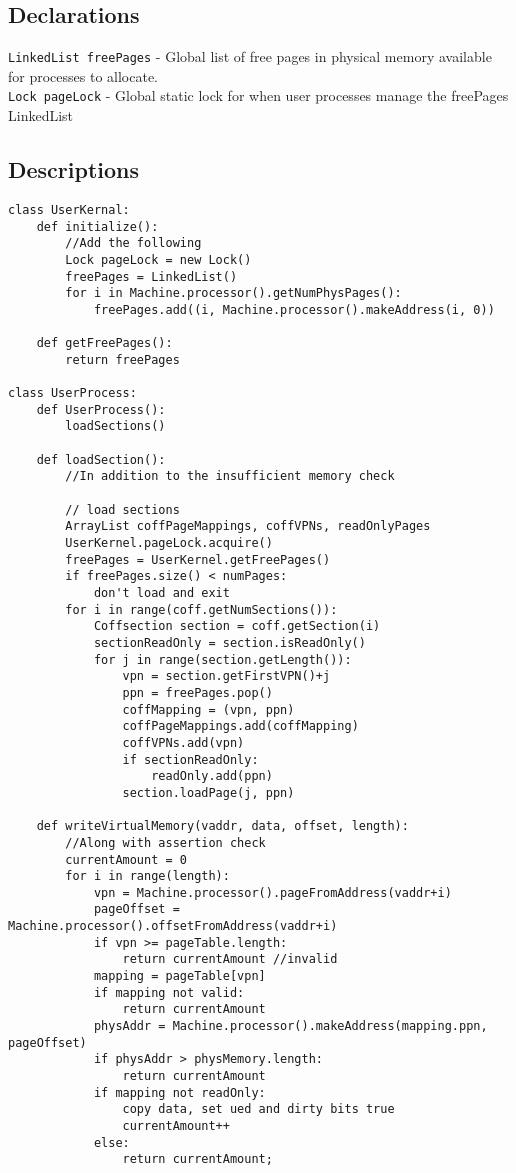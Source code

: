 \documentclass{article}
\begin{document}
\subsection{Declarations}
\texttt{LinkedList freePages} - Global list of free pages in physical memory available for processes to allocate. \\
\texttt{Lock pageLock} - Global static lock for when user processes manage the freePages LinkedList

\subsection{Descriptions}

\begin{verbatim}
class UserKernal:
    def initialize():
        //Add the following
        Lock pageLock = new Lock()
        freePages = LinkedList()
        for i in Machine.processor().getNumPhysPages():
            freePages.add((i, Machine.processor().makeAddress(i, 0))
            
    def getFreePages():
        return freePages
        
class UserProcess:
    def UserProcess():
        loadSections()
    
    def loadSection():
        //In addition to the insufficient memory check

        // load sections
        ArrayList coffPageMappings, coffVPNs, readOnlyPages
        UserKernel.pageLock.acquire()
        freePages = UserKernel.getFreePages()
        if freePages.size() < numPages:
            don't load and exit
        for i in range(coff.getNumSections()):
            Coffsection section = coff.getSection(i)
            sectionReadOnly = section.isReadOnly()
            for j in range(section.getLength()):
                vpn = section.getFirstVPN()+j
                ppn = freePages.pop()
                coffMapping = (vpn, ppn)
                coffPageMappings.add(coffMapping)
                coffVPNs.add(vpn)
                if sectionReadOnly:
                    readOnly.add(ppn)
                section.loadPage(j, ppn)
    
    def writeVirtualMemory(vaddr, data, offset, length):
        //Along with assertion check
        currentAmount = 0
        for i in range(length):
            vpn = Machine.processor().pageFromAddress(vaddr+i)
            pageOffset = Machine.processor().offsetFromAddress(vaddr+i)
            if vpn >= pageTable.length:
                return currentAmount //invalid
            mapping = pageTable[vpn]
            if mapping not valid:
                return currentAmount
            physAddr = Machine.processor().makeAddress(mapping.ppn, pageOffset)
            if physAddr > physMemory.length:
                return currentAmount
            if mapping not readOnly:
                copy data, set ued and dirty bits true
                currentAmount++
            else:
                return currentAmount;


\end{verbatim}
\end{document}
